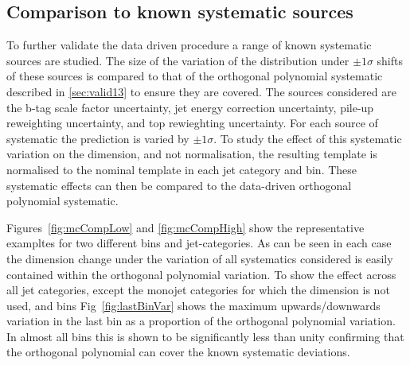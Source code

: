 \subsection{Comparison to known systematic sources}
\label{sec:mcSystStudiesShape}
To further validate the data driven procedure a range of known systematic sources are studied.
The size of the variation of the \mht distribution under $\pm1\sigma$ shifts of these sources is compared 
to that of the orthogonal polynomial systematic described in \ref{sec:valid13} to ensure they are
covered. The sources considered are the b-tag scale factor uncertainty, jet energy correction uncertainty, 
pile-up reweighting uncertainty, and top \Pt rewieghting uncertainty. For each source of systematic the prediction
is varied by $\pm1\sigma$. To study the effect of this systematic variation on the \mht dimension, and not normalisation, 
the resulting template is normalised to the nominal template in each jet category and \scalht bin. 
These systematic effects can then be compared to the data-driven orthogonal polynomial systematic. 

Figures~\ref{fig:mcCompLow} and \ref{fig:mcCompHigh} show the representative exampltes for two different \scalht 
bins and jet-categories. As can be seen in each case the \mht dimension change under the variation of all 
systematics considered is easily contained within the orthogonal polynomial variation. 
To show the effect across all jet categories, except the monojet categories for which the \mht dimension is not used,
and \scalht bins Fig~\ref{fig:lastBinVar} shows the maximum upwards/downwards variation in the last 
\mht bin as a proportion of the orthogonal polynomial variation. In almost all bins this is shown to be 
significantly less than unity confirming that the orthogonal polynomial can cover the known systematic
deviations.

